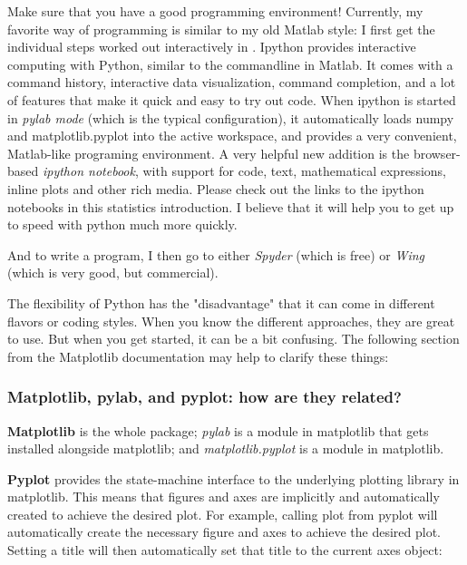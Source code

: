 Make sure that you have a good programming environment! Currently, my favorite way of programming is similar to my old Matlab style: I first get the individual steps worked out interactively in \cite{ipython}. Ipython  provides interactive computing with Python, similar to the commandline in Matlab. It comes with a command history, interactive data visualization, command completion, and a lot of features that make it quick and easy to try out code.
When ipython is started in \emph{pylab mode} (which is the typical
configuration), it automatically loads numpy and matplotlib.pyplot into the
active workspace, and provides a very convenient, Matlab-like programing
environment. A very helpful new addition is the browser-based \emph{ipython
notebook}, with support for code, text, mathematical expressions, inline
plots and other rich media. Please check out the links to the ipython
notebooks in this statistics introduction. I believe that it will  help you
to get up to speed with python much more quickly.

And to write a program, I then go to either \emph{Spyder} (which is free) or \emph{Wing} (which is very good, but commercial).

The flexibility of Python has the "disadvantage" that it can come in
different flavors or coding styles. When you know the different approaches,
they are great to use. But when you get started, it can be a bit confusing.
The following section from the Matplotlib documentation may help to clarify
these things:

\subsubsection{Matplotlib, pylab, and pyplot: how are they related?}

\textbf{Matplotlib} is the whole package; \emph{pylab} is a module in matplotlib that gets installed alongside matplotlib; and \emph{matplotlib.pyplot} is a module in matplotlib.

\textbf{Pyplot} provides the state-machine interface to the underlying plotting library in matplotlib. This means that figures and axes are implicitly and automatically created to achieve the desired plot. For example, calling plot from pyplot will automatically create the necessary figure and axes to achieve the desired plot. Setting a title will then automatically set that title to the current axes object:


